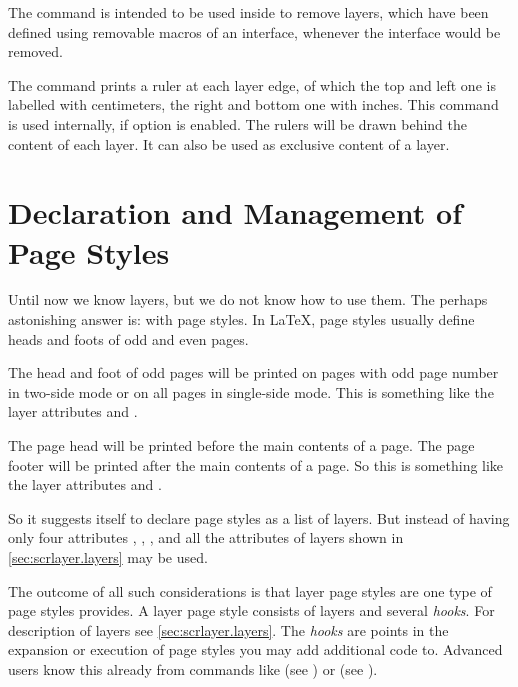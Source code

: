 The command is intended to be used inside
 to remove layers, which have been
defined using removable macros of an interface, whenever the interface would
be removed.%

\begin{Declaration}
\end{Declaration}
%
The command  prints a ruler at each layer edge, of
which the top and left one is labelled with centimeters, the right and bottom
one with inches.  This command is used internally, if option
 is enabled. The rulers will be drawn behind
the content of each layer.  It can also be used as exclusive content of a
layer.%


\section{Declaration and Management of Page Styles}

Until now we know layers, but we do not know how to use them. The
perhaps astonishing answer is: with page styles. In \LaTeX{}, page
styles usually define heads and foots of odd and even pages.

The head and foot of odd pages will be printed on pages with odd
page number in two-side mode or on all pages in single-side mode. This is
something like the layer attributes  and .

The page head will be printed before the main contents of a page. The page
footer will be printed after the main contents of a page. So this is something
like the layer attributes  and .

So it suggests itself to declare page styles as a list of layers. But instead of
having only four attributes , ,
, and  all the attributes of layers
shown in \autoref{sec:scrlayer.layers} may be used.

The outcome of all such considerations is that layer page styles are one type
of page styles  provides. A layer page style consists of
layers and several \emph{hooks}. For description of layers see
\autoref{sec:scrlayer.layers}.  The \emph{hooks} are points in the expansion
or execution of page styles you may add additional code to. Advanced users
know this already from commands like  (see
\cite{latex:usrguide}) or  (see
).


